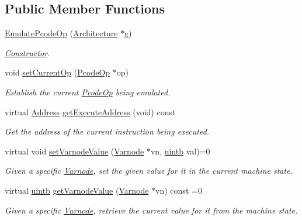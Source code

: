 \subsection*{Public Member Functions}
\begin{DoxyCompactItemize}
\item 
\mbox{\hyperlink{class_emulate_pcode_op_aa09cc9bcd0f6a983c4410d2c6137c002}{Emulate\+Pcode\+Op}} (\mbox{\hyperlink{class_architecture}{Architecture}} $\ast$g)
\begin{DoxyCompactList}\small\item\em \mbox{\hyperlink{class_constructor}{Constructor}}. \end{DoxyCompactList}\item 
void \mbox{\hyperlink{class_emulate_pcode_op_a873b709e6195d1417d83dd8b122663dd}{set\+Current\+Op}} (\mbox{\hyperlink{class_pcode_op}{Pcode\+Op}} $\ast$op)
\begin{DoxyCompactList}\small\item\em Establish the current \mbox{\hyperlink{class_pcode_op}{Pcode\+Op}} being emulated. \end{DoxyCompactList}\item 
virtual \mbox{\hyperlink{class_address}{Address}} \mbox{\hyperlink{class_emulate_pcode_op_a55356dba15ee255dc6d9a7d2dd3832c0}{get\+Execute\+Address}} (void) const
\begin{DoxyCompactList}\small\item\em Get the address of the current instruction being executed. \end{DoxyCompactList}\item 
virtual void \mbox{\hyperlink{class_emulate_pcode_op_a44bfa9a3b6d87135a6bfc6680d01ea27}{set\+Varnode\+Value}} (\mbox{\hyperlink{class_varnode}{Varnode}} $\ast$vn, \mbox{\hyperlink{types_8h_a2db313c5d32a12b01d26ac9b3bca178f}{uintb}} val)=0
\begin{DoxyCompactList}\small\item\em Given a specific \mbox{\hyperlink{class_varnode}{Varnode}}, set the given value for it in the current machine state. \end{DoxyCompactList}\item 
virtual \mbox{\hyperlink{types_8h_a2db313c5d32a12b01d26ac9b3bca178f}{uintb}} \mbox{\hyperlink{class_emulate_pcode_op_a90f1046ddac488b5a88b5b151a307eca}{get\+Varnode\+Value}} (\mbox{\hyperlink{class_varnode}{Varnode}} $\ast$vn) const =0
\begin{DoxyCompactList}\small\item\em Given a specific \mbox{\hyperlink{class_varnode}{Varnode}}, retrieve the current value for it from the machine state. \end{DoxyCompactList}\end{DoxyCompactItemize}
